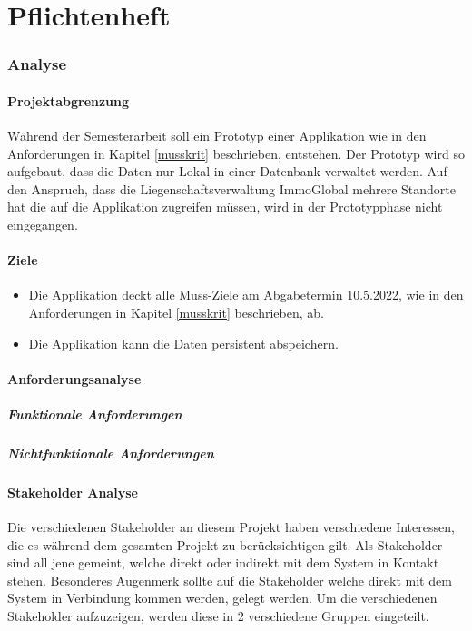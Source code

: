 \part{Pflichtenheft}
\section{Analyse}
\subsection{Projektabgrenzung}
Während der Semesterarbeit soll ein Prototyp einer Applikation wie in den Anforderungen in Kapitel \ref{musskrit} beschrieben, entstehen. Der Prototyp wird so aufgebaut, dass die Daten nur Lokal in einer Datenbank verwaltet werden. Auf den Anspruch, dass die Liegenschaftsverwaltung ImmoGlobal mehrere Standorte hat die auf die Applikation zugreifen müssen, wird in der Prototypphase nicht eingegangen.

\subsection{Ziele}
\begin{itemize}
  \item Die Applikation deckt alle Muss-Ziele am Abgabetermin 10.5.2022, wie in den Anforderungen in Kapitel \ref{musskrit} beschrieben, ab.
  \item Die Applikation kann die Daten persistent abspeichern.
\end{itemize}

\subsection{Anforderungsanalyse}
\subsubsection{Funktionale Anforderungen}
\subsubsection{Nichtfunktionale Anforderungen}

\subsection{Stakeholder Analyse}
Die verschiedenen Stakeholder an diesem Projekt haben verschiedene Interessen, die es während dem gesamten Projekt zu berücksichtigen gilt. Als Stakeholder sind all jene gemeint, welche direkt oder indirekt mit dem System in Kontakt stehen. Besonderes Augenmerk sollte auf die Stakeholder welche direkt mit dem System in Verbindung kommen werden, gelegt werden.
Um die verschiedenen Stakeholder aufzuzeigen, werden diese in 2 verschiedene Gruppen eingeteilt.

